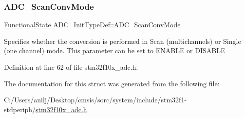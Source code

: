 \subsubsection{\texorpdfstring{A\+D\+C\+\_\+\+Scan\+Conv\+Mode}{ADC\_ScanConvMode}}
{\footnotesize\ttfamily \hyperlink{group___exported__types_gac9a7e9a35d2513ec15c3b537aaa4fba1}{Functional\+State} A\+D\+C\+\_\+\+Init\+Type\+Def\+::\+A\+D\+C\+\_\+\+Scan\+Conv\+Mode}

Specifies whether the conversion is performed in Scan (multichannels) or Single (one channel) mode. This parameter can be set to E\+N\+A\+B\+LE or D\+I\+S\+A\+B\+LE 

Definition at line 62 of file stm32f10x\+\_\+adc.\+h.



The documentation for this struct was generated from the following file\+:\begin{DoxyCompactItemize}
\item 
C\+:/\+Users/anilj/\+Desktop/cmsis/sorc/system/include/stm32f1-\/stdperiph/\hyperlink{stm32f10x__adc_8h}{stm32f10x\+\_\+adc.\+h}\end{DoxyCompactItemize}
